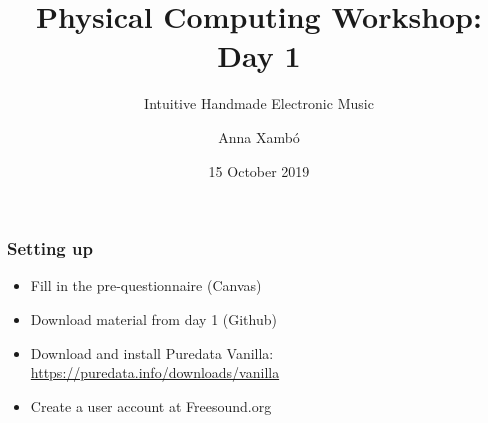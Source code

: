 \documentclass[screen, aspectratio=169]{beamer}
\title[PCW-d1]{Physical Computing Workshop: Day 1}
\subtitle{Intuitive Handmade Electronic Music}
\author[A. Xamb{\'o}]{Anna Xamb{\'o}}
\institute[NTNU]{Department of Music, NTNU}
\date{15 October 2019}
\begin{document}
\begin{frame}
  \titlepage
\end{frame}
%
\begin{frame}
\frametitle{Setting up}
\begin{itemize}
\item Fill in the pre-questionnaire (Canvas)
\item Download material from day 1 (Github)
\item Download and install Puredata Vanilla: \url{https://puredata.info/downloads/vanilla}
\item Create a user account at Freesound.org
\end{itemize}
\end{frame}
%
%
%
\end{document}

